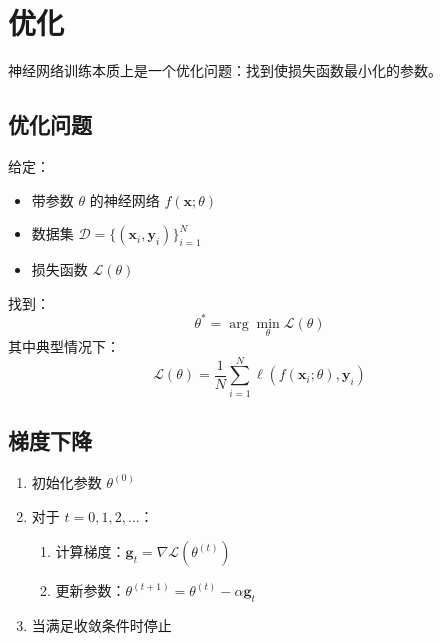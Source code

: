 \section{优化}

神经网络训练本质上是一个优化问题：找到使损失函数最小化的参数。

\subsection{优化问题}

\begin{问题}[神经网络训练]
给定：
\begin{itemize}
    \item 带参数 $\theta$ 的神经网络 $f(\mathbf{x}; \theta)$
    \item 数据集 $\mathcal{D} = \{(\mathbf{x}_i, \mathbf{y}_i)\}_{i=1}^{N}$
    \item 损失函数 $\mathcal{L}(\theta)$
\end{itemize}
找到：
\begin{equation}
\theta^* = \arg\min_{\theta} \mathcal{L}(\theta)
\end{equation}
其中典型情况下：
\begin{equation}
\mathcal{L}(\theta) = \frac{1}{N}\sum_{i=1}^{N} \ell(f(\mathbf{x}_i; \theta), \mathbf{y}_i)
\end{equation}
\end{问题}

\subsection{梯度下降}

\begin{algorithm}[H]
\caption{批量梯度下降}
\begin{enumerate}
    \item 初始化参数 $\theta^{(0)}$
    \item 对于 $t = 0, 1, 2, \ldots$：
    \begin{enumerate}
        \item 计算梯度：$\mathbf{g}_t = \nabla \mathcal{L}(\theta^{(t)})$
        \item 更新参数：$\theta^{(t+1)} = \theta^{(t)} - \alpha \mathbf{g}_t$
    \end{enumerate}
    \item 当满足收敛条件时停止
\end{enumerate}
\end{algorithm}

